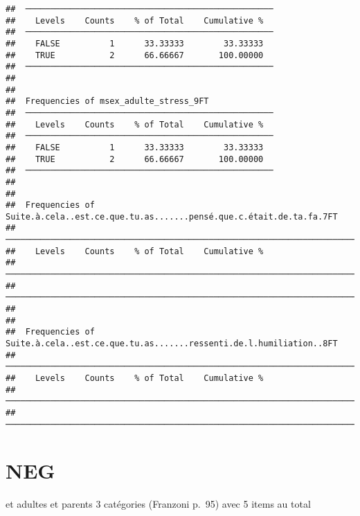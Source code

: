 \documentclass[
]{article}
\begin{document}
\begin{verbatim}
##  ────────────────────────────────────────────────── 
##    Levels    Counts    % of Total    Cumulative %   
##  ────────────────────────────────────────────────── 
##    FALSE          1      33.33333        33.33333   
##    TRUE           2      66.66667       100.00000   
##  ────────────────────────────────────────────────── 
## 
## 
##  Frequencies of msex_adulte_stress_9FT              
##  ────────────────────────────────────────────────── 
##    Levels    Counts    % of Total    Cumulative %   
##  ────────────────────────────────────────────────── 
##    FALSE          1      33.33333        33.33333   
##    TRUE           2      66.66667       100.00000   
##  ────────────────────────────────────────────────── 
## 
## 
##  Frequencies of Suite.à.cela..est.ce.que.tu.as.......pensé.que.c.était.de.ta.fa.7FT 
##  ────────────────────────────────────────────────────────────────────────────────── 
##    Levels    Counts    % of Total    Cumulative %   
##  ────────────────────────────────────────────────────────────────────────────────── 
##  ────────────────────────────────────────────────────────────────────────────────── 
## 
## 
##  Frequencies of Suite.à.cela..est.ce.que.tu.as.......ressenti.de.l.humiliation..8FT 
##  ────────────────────────────────────────────────────────────────────────────────── 
##    Levels    Counts    % of Total    Cumulative %   
##  ────────────────────────────────────────────────────────────────────────────────── 
##  ──────────────────────────────────────────────────────────────────────────────────
\end{verbatim}

\hypertarget{neg}{%
\section{NEG}\label{neg}}

et adultes et parents 3 catégories (Franzoni p.~95) avec 5 items au
total
\end{document}
